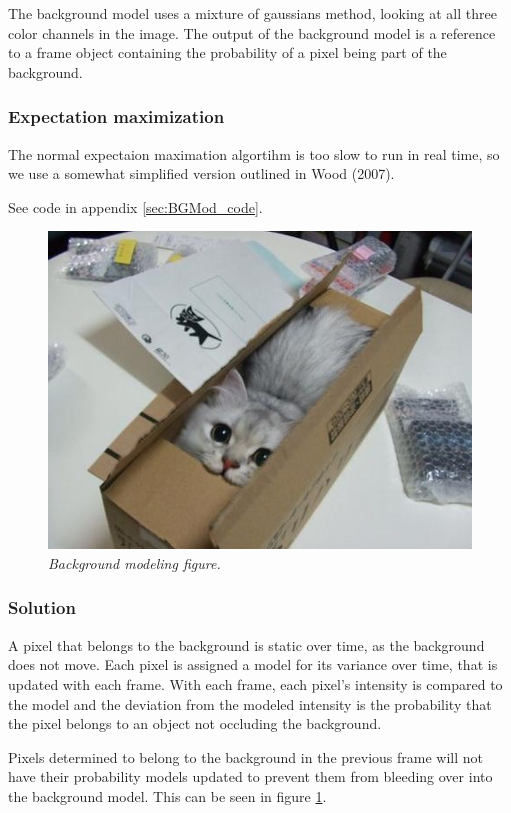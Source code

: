 The background model uses a mixture of gaussians method, looking at all three color channels in the image. The output of the background model is a reference to a frame object containing the probability of a pixel being part of the background.

\subsubsection{Expectation maximization}
The normal expectaion maximation algortihm is too slow to run in real time, so we use a somewhat simplified version outlined in Wood (2007).

See code in appendix \ref{sec:BGMod_code}. %

\begin{figure}[htb]
	\centering
	\includegraphics[width=\linewidth]{images/acatisfinetoo}
	\caption{\textit{Background modeling figure.}}
	\label{fig:BGModeling_fig} %
\end{figure}

\subsubsection{Solution}
A pixel that belongs to the background is static over time, as the background does not move. Each pixel is assigned a model for its variance over time, that is updated with each frame. With each frame, each pixel’s intensity is compared to the model and the deviation from the modeled intensity is the probability that the pixel belongs to an object not occluding the background.

Pixels determined to belong to the background in the previous frame will not have their probability models updated to prevent them from bleeding over into the background model.
This can be seen in figure \ref{fig:BGModeling_fig}. %

